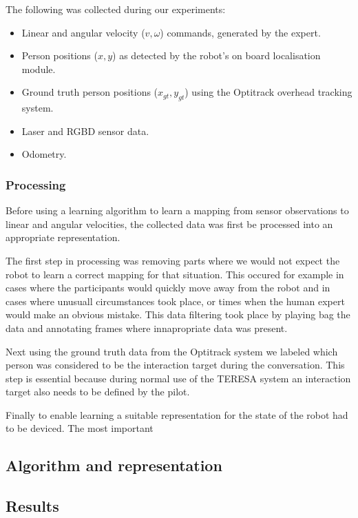 \documentclass[a4paper,11pt]{report}
\begin{document}
The following was collected during our experiments:

\begin{itemize}
	\item Linear and angular velocity ($v,\omega$) commands, generated by the expert. 
	\item Person positions  ($x,y$) as detected by the robot's on board localisation module.
	\item Ground truth person positions ($x_{gt},y_{gt}$) using the Optitrack overhead tracking system.
	\item Laser and RGBD sensor data.
	\item Odometry.
\end{itemize}

\subsubsection{Processing}

Before using a learning algorithm to learn a mapping from sensor observations to linear and angular velocities, the collected data was first be processed into an appropriate representation. 

The first step in processing was removing parts where we would not expect the robot to learn a correct mapping for that situation. This occured for example in cases where the participants would quickly move away from the robot and in cases where unusuall circumstances took place, or times when the human expert would make an obvious mistake. This data filtering took place by playing bag the data and annotating frames where innapropriate data was present. 

Next using the ground truth data from the Optitrack system we labeled which person was considered to be the interaction target during the conversation. This step is essential because during normal use of the TERESA system an interaction target also needs to be defined by the pilot. 

Finally to enable learning a suitable representation for the state of the robot had to be deviced. The most important 



\subsection{Algorithm and representation}

\subsection{Results}
\end{document}

